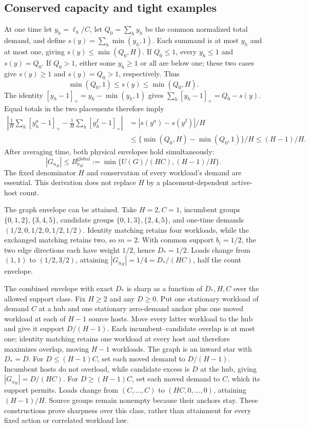 \documentclass[11pt]{article}
\begin{document}
\subsection{Conserved capacity and tight examples}
At one time let $y_h=\ell_h/C$, let $Q_0=\sum_hy_h$ be the common normalized total demand, and define $s(y)=\sum_h\min(y_h,1)$. Each summand is at most $y_h$ and at most one, giving $s(y)\le\min(Q_0,H)$. If $Q_0\le1$, every $y_h\le1$ and $s(y)=Q_0$. If $Q_0>1$, either some $y_h\ge1$ or all are below one; these two cases give $s(y)\ge1$ and $s(y)=Q_0>1$, respectively. Thus
\begin{equation}
 \min(Q_0,1)\le s(y)\le\min(Q_0,H).
\end{equation}
The identity $[y_h-1]_+=y_h-\min(y_h,1)$ gives $\sum_h[y_h-1]_+=Q_0-s(y)$. Equal totals in the two placements therefore imply
\begin{align}
 \left|\frac1H\sum_h[y_h^a-1]_+-\frac1H\sum_h[y_h^I-1]_+\right|
 &=|s(y^a)-s(y^I)|/H\\
 &\le\{\min(Q_0,H)-\min(Q_0,1)\}/H\le(H-1)/H.
\end{align}
After averaging time, both physical envelopes hold simultaneously:
\begin{equation}
 |G_{u_H}|\le B_{u_H}^{\mathrm{global}}:=\min\{U(G)/(HC),(H-1)/H\}.
 \label{eq:combined-physical}
\end{equation}
The fixed denominator $H$ and conservation of every workload's demand are essential. This derivation does not replace $H$ by a placement-dependent active-host count.

The graph envelope can be attained. Take $H=2,C=1$, incumbent groups $\{0,1,2\},\{3,4,5\}$, candidate groups $\{0,1,3\},\{2,4,5\}$, and one-time demands $(1/2,0,1/2,0,1/2,1/2)$. Identity matching retains four workloads, while the exchanged matching retains two, so $m=2$. With common support $b_i=1/2$, the two edge directions each have weight $1/2$, hence $D_*=1/2$. Loads change from $(1,1)$ to $(1/2,3/2)$, attaining $|G_{u_H}|=1/4=D_*/(HC)$, half the count envelope.

The combined envelope with exact $D_*$ is sharp as a function of $D_*,H,C$ over the allowed support class. Fix $H\ge2$ and any $D\ge0$. Put one stationary workload of demand $C$ at a hub and one stationary zero-demand anchor plus one moved workload at each of $H-1$ source hosts. Move every latter workload to the hub and give it support $D/(H-1)$. Each incumbent--candidate overlap is at most one; identity matching retains one workload at every host and therefore maximizes overlap, moving $H-1$ workloads. The graph is an inward star with $D_*=D$. For $D\le(H-1)C$, set each moved demand to $D/(H-1)$. Incumbent hosts do not overload, while candidate excess is $D$ at the hub, giving $|G_{u_H}|=D/(HC)$. For $D\ge(H-1)C$, set each moved demand to $C$, which its support permits. Loads change from $(C,\ldots,C)$ to $(HC,0,\ldots,0)$, attaining $(H-1)/H$. Source groups remain nonempty because their anchors stay. These constructions prove sharpness over this class, rather than attainment for every fixed action or correlated workload law.
\end{document}
